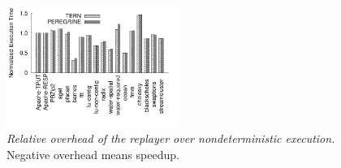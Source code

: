 
\begin{figure}[t]
\centering
\includegraphics[width=0.5\textwidth]{tern/figures/overhead}

\caption{\small {\em Relative overhead of the replayer over
    nondeterministic execution.} Negative overhead means speedup.}
\label{fig:tern-overhead}
\end{figure}

